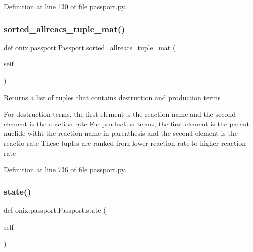 Definition at line 130 of file passport.\+py.

\mbox{\label{classonix_1_1passport_1_1Passport_a1b1159523d20ded8e1cdeb52d634f1d1}} 
\subsubsection{\texorpdfstring{sorted\+\_\+allreacs\+\_\+tuple\+\_\+mat()}{sorted\_allreacs\_tuple\_mat()}}
{\footnotesize\ttfamily def onix.\+passport.\+Passport.\+sorted\+\_\+allreacs\+\_\+tuple\+\_\+mat (\begin{DoxyParamCaption}\item[{}]{self }\end{DoxyParamCaption})}

\begin{DoxyVerb}Returns a list of tuples that contains destruction and production terms

For destruction terms, the first element is the reaction name and the second element
is the reaction rate
For production terms, the first element is the parent nuclide witht the reaction name in parenthesis
and the second element is the reactio rate
These tuples are ranked from lower reaction rate to higher reaction rate\end{DoxyVerb}
 

Definition at line 736 of file passport.\+py.

\mbox{\label{classonix_1_1passport_1_1Passport_ac94fe908420604d6bbcd9fab7895325b}} 
\subsubsection{\texorpdfstring{state()}{state()}}
{\footnotesize\ttfamily def onix.\+passport.\+Passport.\+state (\begin{DoxyParamCaption}\item[{}]{self }\end{DoxyParamCaption})}

